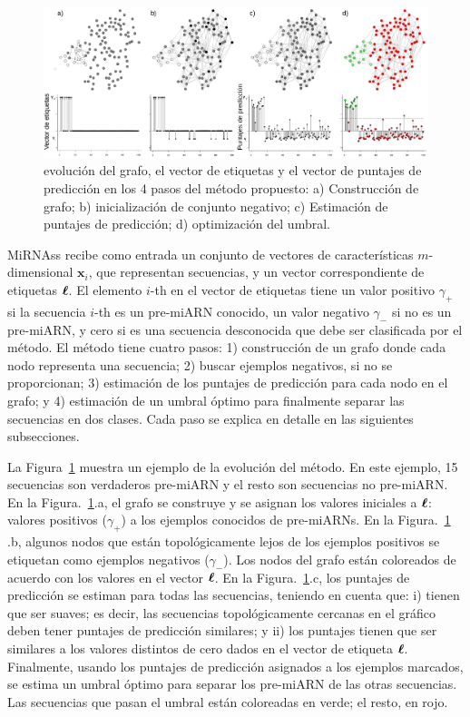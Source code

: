 \begin{figure}[tpb]
	\centering
	\includegraphics[width=\linewidth]{fig/workflow.eps}
	\caption[Evolución del grafo]{evolución del grafo, el vector de etiquetas y el vector de puntajes de predicción en los 4 pasos del método propuesto: a) Construcción de grafo; b)
	inicialización de conjunto negativo; c) Estimación de puntajes de predicción; d) optimización del umbral.}
	\label{fig:workflow}
\end{figure}

MiRNAss recibe como entrada un conjunto de vectores de características $m$-dimensional $\mathbf{x}_{i}$, que representan secuencias, y un vector
correspondiente de etiquetas $\boldsymbol\ell$. El elemento $i$-th en el vector de etiquetas tiene un valor positivo $\gamma_{+}$ si la secuencia $i$-th es un pre-miARN
conocido, un valor negativo $\gamma_{-}$ si no es un pre-miARN, y cero si es una secuencia desconocida que debe ser clasificada por el método. El método
tiene cuatro pasos: 1) construcción de un grafo donde cada nodo representa una secuencia; 2) buscar ejemplos negativos, si no se proporcionan; 3) estimación
de los puntajes de predicción para cada nodo en el grafo; y 4) estimación de un umbral óptimo para finalmente separar las secuencias en dos clases. Cada
paso se explica en detalle en las siguientes subsecciones.

La Figura~\ref{fig:workflow} muestra un ejemplo de la evolución del método. En este ejemplo, 15 secuencias son verdaderos pre-miARN y el resto son secuencias
no pre-miARN. En la Figura.~\ref{fig:workflow}.a, el grafo se construye y se asignan los valores iniciales a $\boldsymbol\ell$: valores positivos ($\gamma_{+}$) a los
ejemplos conocidos de pre-miARNs. En la Figura.~\ref{fig:workflow} .b, algunos nodos que están topológicamente lejos de los ejemplos positivos se etiquetan como
ejemplos negativos ($\gamma_{-}$). Los nodos del grafo están coloreados de acuerdo con los valores en el vector $\boldsymbol\ell$. En la Figura.~\ref{fig:workflow}.c,
los puntajes de predicción se estiman para todas las secuencias, teniendo en cuenta que: i) tienen que ser suaves; es decir, las secuencias topológicamente
cercanas en el gráfico deben tener puntajes de predicción similares; y ii) los puntajes tienen que ser similares a los valores distintos de cero dados en el
vector de etiqueta $\boldsymbol\ell$. Finalmente, usando los puntajes de predicción asignados a los ejemplos marcados, se estima un umbral óptimo para separar los
pre-miARN de las otras secuencias. Las secuencias que pasan el umbral están coloreadas en verde; el resto, en rojo.

